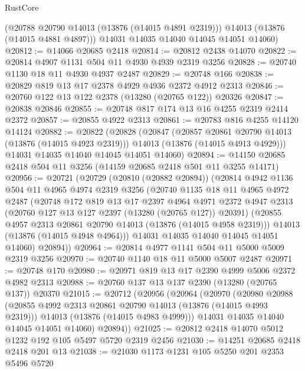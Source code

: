 \begin{lexlean}{RustCore}
\begin{coremodule}
        (@20788 @20790 @14013 (@13876 (@14015 @4891 @2319)))
        @14013
        (@13876 (@14015 @4881 @4897)))
      @14031
      @14035
      @14040
      @14045
      @14051
      @14060)
@20812 := @14066 @20685 @2418
@20814 := @20812 @2438 @14070
@20822 := @20814 @4907 @1131 @504 @11 @4930 @4939 @2319 @3256
@20828 := @20740 @1130 @18 @11 @4930 @4937 @2487
@20829 := @20748 @166
@20838 := @20829 @819 @13 @17 @2378 @4929 @4936 @2372 @4912 @2313
@20846 := @20760 @122 @13 @122 @2378 (@13280 (@20765 @122)) @20326
@20847 := @20838 @20846
@20855 := @20748 @817 @174 @13 @16 @4255 @2319 @2414 @2372
@20857 := @20855 @4922 @2313
@20861 := @20783 @816 @4255 @14120 @14124
@20882 := @20822
    (@20828
      (@20847
        (@20857 @20861 @20790 @14013 (@13876 (@14015 @4923 @2319)))
        @14013
        (@13876 (@14015 @4913 @4929)))
      @14031
      @14035
      @14040
      @14045
      @14051
      @14060)
@20894 := @14150 @20685 @2418 @504 @11 @3256 (@14159 @20685 @2418 @501 @11 @3255 @14171)
@20956 := @20721
    (@20729
      (@20810 (@20882 @20894))
      (@20814
        @4942
        @1136
        @504
        @11
        @4965
        @4974
        @2319
        @3256
        (@20740
          @1135
          @18
          @11
          @4965
          @4972
          @2487
          (@20748
            @172
            @819
            @13
            @17
            @2397
            @4964
            @4971
            @2372
            @4947
            @2313
            (@20760 @127 @13 @127 @2397 (@13280 (@20765 @127)) @20391)
            (@20855 @4957 @2313 @20861 @20790 @14013 (@13876 (@14015 @4958 @2319)))
            @14013
            (@13876 (@14015 @4948 @4964)))
          @14031
          @14035
          @14040
          @14045
          @14051
          @14060)
        @20894))
@20964 := @20814 @4977 @1141 @504 @11 @5000 @5009 @2319 @3256
@20970 := @20740 @1140 @18 @11 @5000 @5007 @2487
@20971 := @20748 @170
@20980 := @20971 @819 @13 @17 @2390 @4999 @5006 @2372 @4982 @2313
@20988 := @20760 @137 @13 @137 @2390 (@13280 (@20765 @137)) @20370
@21015 := @20712
    (@20956
      (@20964
        (@20970
          (@20980
            @20988
            (@20855 @4992 @2313 @20861 @20790 @14013 (@13876 (@14015 @4993 @2319)))
            @14013
            (@13876 (@14015 @4983 @4999)))
          @14031
          @14035
          @14040
          @14045
          @14051
          @14060)
        @20894))
@21025 := @20812 @2418 @14070 @5012 @1232 @192 @105 @5497 @5720 @2319 @2456
@21030 := @14251 @20685 @2418 @2418 @201 @13
@21038 := @21030 @1173 @1231 @105 @5250 @201 @2353 @5496 @5720

\end{coremodule}
\end{lexlean}
